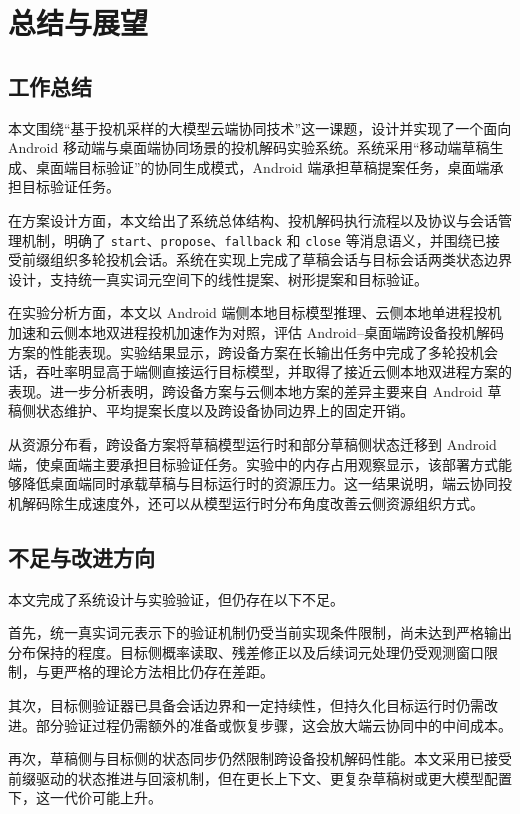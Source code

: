\section{总结与展望}

\subsection{工作总结}

本文围绕“基于投机采样的大模型云端协同技术”这一课题，设计并实现了一个面向 Android 移动端与桌面端协同场景的投机解码实验系统。系统采用“移动端草稿生成、桌面端目标验证”的协同生成模式，Android 端承担草稿提案任务，桌面端承担目标验证任务。

在方案设计方面，本文给出了系统总体结构、投机解码执行流程以及协议与会话管理机制，明确了 \texttt{start}、\texttt{propose}、\texttt{fallback} 和 \texttt{close} 等消息语义，并围绕已接受前缀组织多轮投机会话。系统在实现上完成了草稿会话与目标会话两类状态边界设计，支持统一真实词元空间下的线性提案、树形提案和目标验证。

在实验分析方面，本文以 Android 端侧本地目标模型推理、云侧本地单进程投机加速和云侧本地双进程投机加速作为对照，评估 Android--桌面端跨设备投机解码方案的性能表现。实验结果显示，跨设备方案在长输出任务中完成了多轮投机会话，吞吐率明显高于端侧直接运行目标模型，并取得了接近云侧本地双进程方案的表现。进一步分析表明，跨设备方案与云侧本地方案的差异主要来自 Android 草稿侧状态维护、平均提案长度以及跨设备协同边界上的固定开销。

从资源分布看，跨设备方案将草稿模型运行时和部分草稿侧状态迁移到 Android 端，使桌面端主要承担目标验证任务。实验中的内存占用观察显示，该部署方式能够降低桌面端同时承载草稿与目标运行时的资源压力。这一结果说明，端云协同投机解码除生成速度外，还可以从模型运行时分布角度改善云侧资源组织方式。

\subsection{不足与改进方向}

本文完成了系统设计与实验验证，但仍存在以下不足。

首先，统一真实词元表示下的验证机制仍受当前实现条件限制，尚未达到严格输出分布保持的程度。目标侧概率读取、残差修正以及后续词元处理仍受观测窗口限制，与更严格的理论方法相比仍存在差距。

其次，目标侧验证器已具备会话边界和一定持续性，但持久化目标运行时仍需改进。部分验证过程仍需额外的准备或恢复步骤，这会放大端云协同中的中间成本。

再次，草稿侧与目标侧的状态同步仍然限制跨设备投机解码性能。本文采用已接受前缀驱动的状态推进与回滚机制，但在更长上下文、更复杂草稿树或更大模型配置下，这一代价可能上升。

